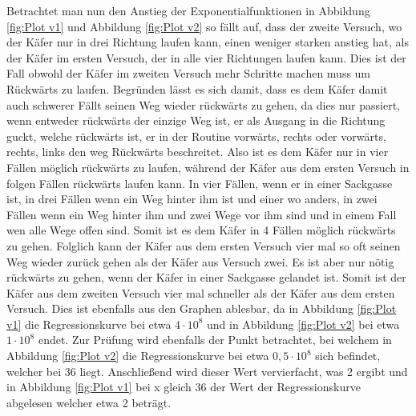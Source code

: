 \documentclass[11pt, a4paper]{article}
\begin{document}
Betrachtet man nun den Anstieg der Exponentialfunktionen in Abbildung \ref{fig:Plot v1} und Abbildung \ref{fig:Plot v2} so fällt auf, dass der zweite Versuch, wo der Käfer nur in drei Richtung laufen kann, einen weniger starken anstieg hat, als der Käfer im ersten Versuch, der in alle vier Richtungen laufen kann. Dies ist der Fall obwohl der Käfer im zweiten Versuch mehr Schritte machen muss um Rückwärts zu laufen. Begründen lässt es sich damit, dass es dem Käfer damit auch schwerer Fällt seinen Weg wieder rückwärts zu gehen, da dies nur passiert, wenn entweder rückwärts der einzige Weg ist, er als Ausgang in die Richtung guckt, welche rückwärts ist, er in der Routine vorwärts, rechts oder vorwärts, rechts, links den weg Rückwärts beschreitet. Also ist es dem Käfer nur in vier Fällen möglich rückwärts zu laufen, während der Käfer aus dem ersten Versuch in folgen Fällen rückwärts laufen kann. In vier Fällen, wenn er in einer Sackgasse ist, in drei Fällen wenn ein Weg hinter ihm ist und einer wo anders, in zwei Fällen wenn ein Weg hinter ihm und zwei Wege vor ihm sind und in einem Fall wen alle Wege offen sind. Somit ist es dem Käfer in 4 Fällen möglich rückwärts zu gehen. Folglich kann der Käfer aus dem ersten Versuch vier mal so oft seinen Weg wieder zurück gehen als der Käfer aus Versuch zwei. Es ist aber nur nötig rückwärts zu gehen, wenn der Käfer in einer Sackgasse gelandet ist. Somit ist der Käfer aus dem zweiten Versuch vier mal schneller als der Käfer aus dem ersten Versuch. Dies ist ebenfalls aus den Graphen ablesbar, da in Abbildung \ref{fig:Plot v1} die Regressionskurve bei etwa $4 \cdot 10^8$ und in Abbildung \ref{fig:Plot v2} bei etwa $1 \cdot 10^8$ endet. Zur Prüfung wird ebenfalls der Punkt betrachtet, bei welchem in Abbildung \ref{fig:Plot v2} die Regressionskurve bei etwa $0,5 \cdot 10^8$ sich befindet, welcher bei 36 liegt. Anschließend wird dieser Wert vervierfacht, was 2 ergibt und in Abbildung \ref{fig:Plot v1} bei x gleich 36 der Wert der Regressionskurve abgelesen welcher etwa 2 beträgt.
\end{document}
